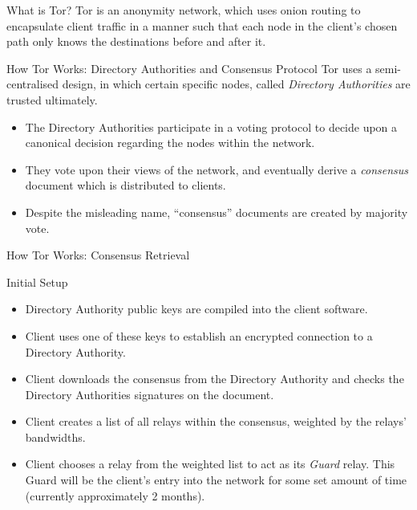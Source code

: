 \documentclass[9pt,a4paper]{beamer}
\begin{document}
\begin{frame}{What is Tor?}
  Tor is an anonymity network, which uses onion routing to encapsulate client traffic in a manner
  such that each node in the client's chosen path only knows the destinations before and after it.
\end{frame}


\begin{frame}{How Tor Works: Directory Authorities and Consensus Protocol}
  Tor uses a semi-centralised design, in which certain specific nodes, called
  \emph{Directory Authorities} are trusted ultimately.

  \begin{itemize}
    \item<2-> The Directory Authorities participate in a
      voting protocol to decide upon a canonical decision regarding the nodes within the network.
    \item<3-> They vote upon their views of the network, and eventually derive a \emph{consensus}
      document which is distributed to clients.
    \item<4-> Despite the misleading name, ``consensus'' documents are created by majority vote.
  \end{itemize}
\end{frame}


\begin{frame}{How Tor Works: Consensus Retrieval}
  \begin{block}{Initial Setup}
    \begin{itemize}
      \item<1-> Directory Authority public keys are compiled into the client software.
      \item<2-> Client uses one of these keys to establish an encrypted connection to a
        Directory Authority.
      \item<3-> Client downloads the consensus from the Directory Authority and checks the Directory
        Authorities signatures on the document.
      \item<4-> Client creates a list of all relays within the consensus, weighted by the relays' bandwidths.
      \item<5-> Client chooses a relay from the weighted list to act as its
        \emph{Guard} relay. This Guard will be the client's entry into the network for some set amount
        of time (currently approximately 2 months).
  \end{itemize}
  \end{block}

\end{frame}
\end{document}
